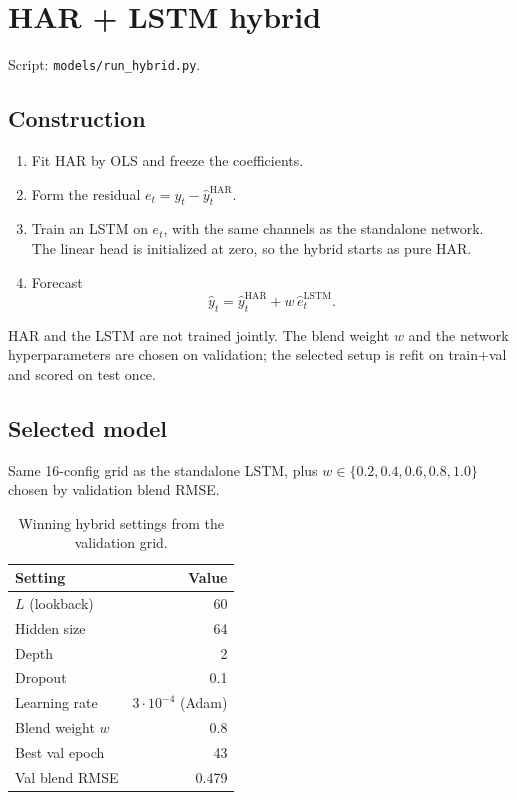\documentclass[12pt]{article}
\begin{document}
\section{HAR + LSTM hybrid}
Script: \texttt{models/run\_hybrid.py}.

\subsection{Construction}
\begin{enumerate}
  \item Fit HAR by OLS and freeze the coefficients.
  \item Form the residual \(e_t=y_t-\widehat y_t^{\mathrm{HAR}}\).
  \item Train an LSTM on \(e_t\), with the same channels as the standalone network.
    The linear head is initialized at zero, so the hybrid starts as pure HAR.
  \item Forecast
    \[
    \widehat y_t
    =
    \widehat y_t^{\mathrm{HAR}}
    +
    w\,\widehat e_t^{\mathrm{LSTM}}.
    \]
\end{enumerate}
HAR and the LSTM are not trained jointly. The blend weight \(w\) and the network hyperparameters are chosen on validation; the selected setup is refit on train+val and scored on test once.

\subsection{Selected model}
Same 16-config grid as the standalone LSTM, plus \(w\in\{0.2,0.4,0.6,0.8,1.0\}\) chosen by validation blend RMSE.

\begin{table}[H]
\centering
\begin{tabular}{lr}
\toprule
Setting & Value \\
\midrule
\(L\) (lookback) & 60 \\
Hidden size & 64 \\
Depth & 2 \\
Dropout & 0.1 \\
Learning rate & \(3\cdot 10^{-4}\) (Adam) \\
Blend weight \(w\) & 0.8 \\
Best val epoch & 43 \\
Val blend RMSE & 0.479 \\
\bottomrule
\end{tabular}
\caption{Winning hybrid settings from the validation grid.}
\end{table}
\end{document}
